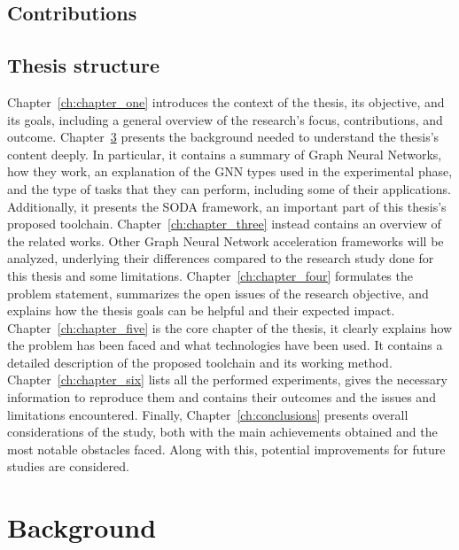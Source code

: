 \documentclass{Configuration_Files/PoliMi3i_thesis}
\begin{document}
    \section{Contributions}


    \section{Thesis structure}

    Chapter~\ref{ch:chapter_one} introduces the context of the thesis, its objective, and its goals, including a general overview of the research's focus, contributions, and outcome.
    Chapter~\ref{ch:chapter_two} presents the background needed to understand the thesis's content deeply.
    In particular, it contains a summary of Graph Neural Networks, how they work, an explanation of the GNN types used in the experimental phase, and the type of tasks that they can perform, including some of their applications.
    Additionally, it presents the SODA framework, an important part of this thesis's proposed toolchain.
    Chapter~\ref{ch:chapter_three} instead contains an overview of the related works.
    Other Graph Neural Network acceleration frameworks will be analyzed, underlying their differences compared to the research study done for this thesis and some limitations.
    Chapter~\ref{ch:chapter_four} formulates the problem statement, summarizes the open issues of the research objective, and explains how the thesis goals can be helpful and their expected impact.
    Chapter~\ref{ch:chapter_five} is the core chapter of the thesis, it clearly explains how the problem has been faced and what technologies have been used.
    It contains a detailed description of the proposed toolchain and its working method.
    Chapter~\ref{ch:chapter_six} lists all the performed experiments, gives the necessary information to reproduce them and contains their outcomes and the issues and limitations encountered.
    Finally, Chapter~\ref{ch:conclusions} presents overall considerations of the study, both with the main achievements obtained and the most notable obstacles faced.
    Along with this, potential improvements for future studies are considered.





    \chapter{Background}
    \label{ch:chapter_two}%
\end{document}
